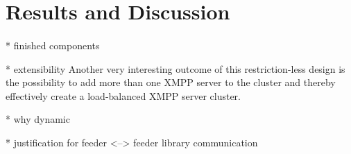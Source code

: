 \section{Results and Discussion}
\label{sec:discussion}
\paragraph{}

* finished components

* extensibility
Another very interesting outcome of this restriction-less design is the possibility to add more than one XMPP server to the cluster and thereby effectively create a load-balanced XMPP server cluster.

* why dynamic

* justification for feeder <--> feeder library communication